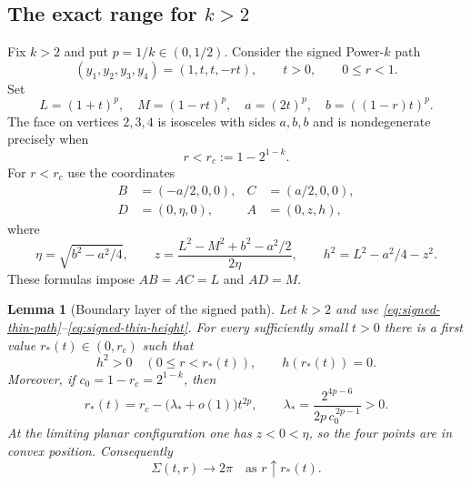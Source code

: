 \documentclass[11pt,a4paper]{article}
\newtheorem{lemma}[theorem]{Lemma}
\theoremstyle{definition}
\theoremstyle{remark}
\begin{document}
\subsection{\texorpdfstring{The exact range for $k>2$}
{The exact range for k above 2}}

Fix $k>2$ and put $p=1/k\in(0,1/2)$.  Consider the signed Power-$k$ path
\begin{equation}\label{eq:signed-thin-path}
 (y_1,y_2,y_3,y_4)=(1,t,t,-rt),
 \qquad t>0,\qquad0\leq r<1.
\end{equation}
Set
\begin{equation}\label{eq:signed-thin-lengths}
 L=(1+t)^p,\quad M=(1-rt)^p,\quad
 a=(2t)^p,\quad b=((1-r)t)^p.
\end{equation}
The face on vertices $2,3,4$ is isosceles with sides $a,b,b$ and is
nondegenerate precisely when
\begin{equation}\label{eq:rc}
 r<r_c:=1-2^{1-k}.
\end{equation}
For $r<r_c$ use the coordinates
\begin{equation}\label{eq:signed-thin-coordinates}
 \begin{aligned}
 B&=(-a/2,0,0),& C&=(a/2,0,0),\\
 D&=(0,\eta,0),& A&=(0,z,h),
 \end{aligned}
\end{equation}
where
\begin{equation}\label{eq:signed-thin-height}
 \eta=\sqrt{b^2-a^2/4},\qquad
 z=\frac{L^2-M^2+b^2-a^2/2}{2\eta},\qquad
 h^2=L^2-a^2/4-z^2.
\end{equation}
These formulas impose $AB=AC=L$ and $AD=M$.

\begin{lemma}[Boundary layer of the signed path]\label{lem:signed-boundary}
Let $k>2$ and use \eqref{eq:signed-thin-path}--\eqref{eq:signed-thin-height}.
For every sufficiently small $t>0$ there is a first value
$r_*(t)\in(0,r_c)$ such that
\[
 h^2>0\quad(0\le r<r_*(t)),\qquad h(r_*(t))=0.
\]
Moreover, if $c_0=1-r_c=2^{1-k}$, then
\begin{equation}\label{eq:rstar-asymptotic}
 r_*(t)=r_c-\bigl(\lambda_*+o(1)\bigr)t^{2p},
 \qquad
 \lambda_*=
 \frac{2^{4p-6}}{2p\,c_0^{\,2p-1}}>0.
\end{equation}
At the limiting planar configuration one has $z<0<\eta$, so the four points
are in convex position.  Consequently
\begin{equation}\label{eq:signed-lower-limit}
 \Sigma(t,r)\longrightarrow2\pi
 \quad\text{as }r\uparrow r_*(t).
\end{equation}
\end{lemma}
\end{document}
